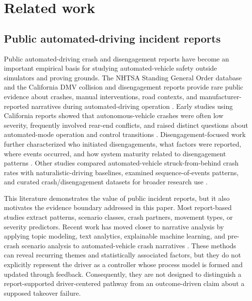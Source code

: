 \section{Related work}
\label{sec:related}

\subsection{Public automated-driving incident reports}

Public automated-driving crash and disengagement reports have become an important empirical basis for studying automated-vehicle safety outside simulators and proving grounds. The NHTSA Standing General Order database and the California DMV collision and disengagement reports provide rare public evidence about crashes, manual interventions, road contexts, and manufacturer-reported narratives during automated-driving operation \citep{nhtsa2021sgo,californiadmv_collision,californiadmv_disengagement}. Early studies using California reports showed that autonomous-vehicle crashes were often low severity, frequently involved rear-end conflicts, and raised distinct questions about automated-mode operation and control transitions \citep{favaro2017examining,wang2019mechanism,boggs2020crashes}. Disengagement-focused work further characterized who initiated disengagements, what factors were reported, where events occurred, and how system maturity related to disengagement patterns \citep{boggs2020disengagement}. Other studies compared automated-vehicle struck-from-behind crash rates with naturalistic-driving baselines, examined sequence-of-events patterns, and curated crash/disengagement datasets for broader research use \citep{goodall2021struck,song2021sequences,sinha2021data}.

This literature demonstrates the value of public incident reports, but it also motivates the evidence boundary addressed in this paper. Most report-based studies extract patterns, scenario classes, crash partners, movement types, or severity predictors. Recent work has moved closer to narrative analysis by applying topic modeling, text analytics, explainable machine learning, and pre-crash scenario analysis to automated-vehicle crash narratives \citep{alambeigi2020themes,li2024latent,li2025precrash}. These methods can reveal recurring themes and statistically associated factors, but they do not explicitly represent the driver as a controller whose process model is formed and updated through feedback. Consequently, they are not designed to distinguish a report-supported driver-centered pathway from an outcome-driven claim about a supposed takeover failure.

